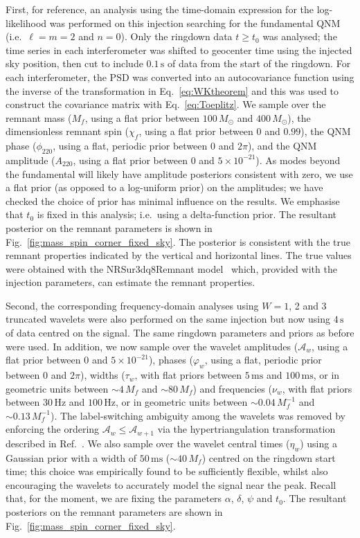 First, for reference, an analysis using the time-domain expression for the log-likelihood was performed on this injection searching for the fundamental QNM (i.e.\ $\ell = m = 2$ and $n=0$).
Only the ringdown data $t\geq t_0$ was analysed; the time series in each interferometer was shifted to geocenter time using the injected sky position, then cut to include $0.1\,\mathrm{s}$ of data from the start of the ringdown.
For each interferometer, the PSD was converted into an autocovariance function using the inverse of the transformation in Eq.~\ref{eq:WKtheorem} and this was used to construct the covariance matrix with Eq.~\ref{eq:Toeplitz}.
We sample over the remnant mass ($M_f$, using a flat prior between $100\,M_\odot$ and $400\,M_\odot$), the dimensionless remnant spin ($\chi_f$, using a flat prior between $0$ and $0.99$), the QNM phase ($\phi_{220}$, using a flat, periodic prior between $0$ and $2\pi$), and the QNM amplitude ($A_{220}$, using a flat prior between 0 and $5 \times 10^{-21}$).
As modes beyond the fundamental will likely have amplitude posteriors consistent with zero, we use a flat prior (as opposed to a log-uniform prior) on the amplitudes; we have checked the choice of prior has minimal influence on the results.
We emphasise that $t_0$ is fixed in this analysis; i.e.\ using a delta-function prior.
The resultant posterior on the remnant parameters is shown in Fig.~\ref{fig:mass_spin_corner_fixed_sky}.
The posterior is consistent with the true remnant properties indicated by the vertical and horizontal lines. 
The true values were obtained with the NRSur3dq8Remnant model~\cite{Varma:2018aht, Varma:2019csw, vijay_varma_2018_1435832} which, provided with the injection parameters, can estimate the remnant properties.

Second, the corresponding frequency-domain analyses using $W=1$, 2 and 3 truncated wavelets were also performed on the same injection but now using $4\,\mathrm{s}$ of data centred on the signal.
The same ringdown parameters and priors as before were used. 
In addition, we now sample over the wavelet amplitudes ($\mathcal{A}_w$, using a flat prior between 0 and $5 \times 10^{-21}$), phases ($\varphi_w$, using a flat, periodic prior between $0$ and $2\pi$), widths ($\tau_w$, with flat priors between $5\,\mathrm{ms}$ and $100\,\mathrm{ms}$, or in geometric units between $\sim 4\,M_f$ and $\sim 80\,M_f$) and frequencies ($\nu_w$, with flat priors between $30\,\mathrm{Hz}$ and $100\,\mathrm{Hz}$, or in geometric units between $\sim 0.04\,M_f^{-1}$ and $\sim 0.13\,M_f^{-1}$). 
The label-switching ambiguity among the wavelets was removed by enforcing the ordering $\mathcal{A}_w\leq\mathcal{A}_{w+1}$ via the hypertriangulation transformation described in Ref.~\cite{Buscicchio:2019rir}.
We also sample over the wavelet central times ($\eta_w$) using a Gaussian prior with a width of $50\,\mathrm{ms}$ ($\sim 40\,M_f$) centred on the ringdown start time; this choice was empirically found to be sufficiently flexible, whilst also encouraging the wavelets to accurately model the signal near the peak.
Recall that, for the moment, we are fixing the parameters $\alpha$, $\delta$, $\psi$ and $t_0$.
The resultant posteriors on the remnant parameters are shown in Fig.~\ref{fig:mass_spin_corner_fixed_sky}.

